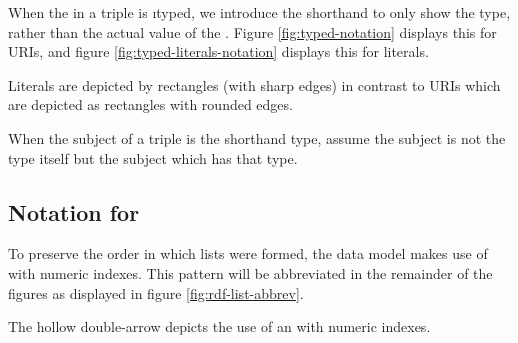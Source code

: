   When the  in a triple is \i{typed}, we introduce the shorthand
  to only show the type, rather than the actual value of the .
  Figure \ref{fig:typed-notation} displays this for URIs, and figure
  \ref{fig:typed-literals-notation} displays this for literals.


  Literals are depicted by rectangles (with sharp edges) in contrast to URIs
  which are depicted as rectangles with rounded edges.


  When the subject of a triple is the shorthand type, assume the subject is not
  the type itself but the subject which has that type.

\subsection{Notation for }

  To preserve the order in which lists were formed, the data model makes use
  of  with numeric indexes.  This pattern will be abbreviated
  in the remainder of the figures as displayed in figure
  \ref{fig:rdf-list-abbrev}.


  The hollow double-arrow depicts the use of an  with numeric
  indexes.
